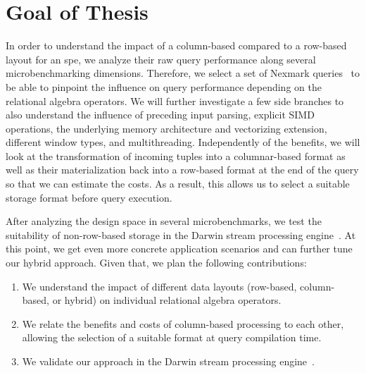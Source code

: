 \section{Goal of Thesis}
\label{sec:goal}

In order to understand the impact of a column-based compared to a row-based layout for an \ac{spe}, we analyze their raw query performance along several microbenchmarking dimensions.
Therefore, we select a set of Nexmark queries~\cite{tucker2008nexmark} to be able to pinpoint the influence on query performance depending on the relational algebra operators.
We will further investigate a few side branches to also understand the influence of preceding input parsing, explicit SIMD operations, the underlying memory architecture and vectorizing extension, different window types, and multithreading. 
Independently of the benefits, we will look at the transformation of incoming tuples into a columnar-based format as well as their materialization back into a row-based format at the end of the query so that we can estimate the costs.
As a result, this allows us to select a suitable storage format before query execution.

After analyzing the design space in several microbenchmarks, we test the suitability of non-row-based storage in the Darwin stream processing engine~\cite{DBLP:conf/cidr/BensonR22}.
At this point, we get even more concrete application scenarios and can further tune our hybrid approach. 
Given that, we plan the following contributions:
\begin{enumerate}
    \item We understand the impact of different data layouts (row-based, column-based, or hybrid) on individual relational algebra operators.
    \item We relate the benefits and costs of column-based processing to each other, allowing the selection of a suitable format at query compilation time.
    \item We validate our approach in the Darwin stream processing engine~\cite[]{DBLP:conf/cidr/BensonR22}.
\end{enumerate}